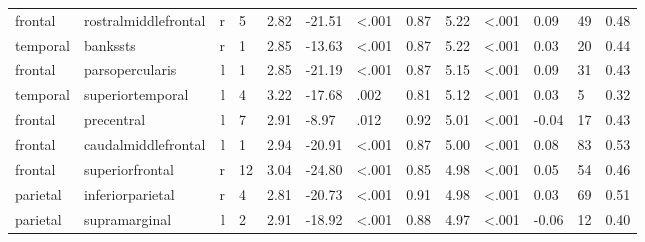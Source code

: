 \documentclass{article}
\begin{document}
\begin{longtable}{llrR{1.3cm}R{1cm}R{1.3cm}R{1cm}R{1cm}R{1.3cm}R{1cm}R{1.8cm}R{1.3cm}R{1.8cm}}
   frontal &      rostralmiddlefrontal &    r &         5 &                  2.82 &           -21.51 &      \textless.001 &                               0.87 &                          5.22 &                   \textless.001 &   0.09 &     49 &      0.48 \\
  temporal &                  bankssts &    r &         1 &                  2.85 &           -13.63 &      \textless.001 &                               0.87 &                          5.22 &                   \textless.001 &   0.03 &     20 &      0.44 \\
   frontal &           parsopercularis &    l &         1 &                  2.85 &           -21.19 &      \textless.001 &                               0.87 &                          5.15 &                   \textless.001 &   0.09 &     31 &      0.43 \\
  temporal &          superiortemporal &    l &         4 &                  3.22 &           -17.68 &               .002 &                               0.81 &                          5.12 &                   \textless.001 &   0.03 &      5 &      0.32 \\
   frontal &                precentral &    l &         7 &                  2.91 &            -8.97 &               .012 &                               0.92 &                          5.01 &                   \textless.001 &  -0.04 &     17 &      0.43 \\
   frontal &       caudalmiddlefrontal &    l &         1 &                  2.94 &           -20.91 &      \textless.001 &                               0.87 &                          5.00 &                   \textless.001 &   0.08 &     83 &      0.53 \\
   frontal &           superiorfrontal &    r &        12 &                  3.04 &           -24.80 &      \textless.001 &                               0.85 &                          4.98 &                   \textless.001 &   0.05 &     54 &      0.46 \\
  parietal &          inferiorparietal &    r &         4 &                  2.81 &           -20.73 &      \textless.001 &                               0.91 &                          4.98 &                   \textless.001 &   0.03 &     69 &      0.51 \\
  parietal &             supramarginal &    l &         2 &                  2.91 &           -18.92 &      \textless.001 &                               0.88 &                          4.97 &                   \textless.001 &  -0.06 &     12 &      0.40 \\

\end{longtable}
\end{document}
